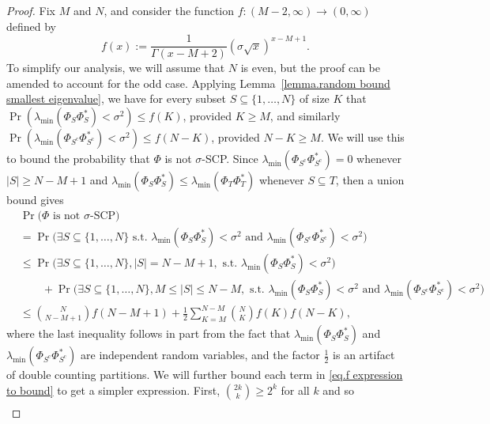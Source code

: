 \documentclass[times,10pt]{elsarticle}
\theoremstyle{plain}
\begin{document}
\begin{proof}
Fix $M$ and $N$, and consider the function $f\colon(M-2,\infty)\rightarrow(0,\infty)$ defined by
\begin{equation*}
f(x):=\frac{1}{\Gamma(x-M+2)}(\sigma\sqrt{x})^{x-M+1}.
\end{equation*}
To simplify our analysis, we will assume that $N$ is even, but the proof can be amended to account for the odd case.
Applying Lemma~\ref{lemma.random bound smallest eigenvalue}, we have for every subset $S\subseteq\{1,\ldots,N\}$ of size $K$ that $\operatorname{Pr}(\lambda_\mathrm{min}(\Phi_S\Phi_S^*)<\sigma^2)\leq f(K)$, provided $K\geq M$, and similarly $\operatorname{Pr}(\lambda_\mathrm{min}(\Phi_{S^\mathrm{c}}\Phi_{S^\mathrm{c}}^*)<\sigma^2)\leq f(N-K)$, provided $N-K\geq M$.
We will use this to bound the probability that $\Phi$ is not $\sigma$-SCP.
Since $\lambda_\mathrm{min}(\Phi_{S^\mathrm{c}}\Phi_{S^\mathrm{c}}^*)=0$ whenever $|S|\geq N-M+1$ and $\lambda_\mathrm{min}(\Phi_S\Phi_S^*)\leq\lambda_\mathrm{min}(\Phi_T\Phi_T^*)$ whenever $S\subseteq T$, then a union bound gives
\begin{align}
\nonumber
&\operatorname{Pr}\Big(\Phi\mbox{ is not $\sigma$-SCP}\Big)\\
\nonumber
&=\operatorname{Pr}\Big(\exists S\subseteq\{1,\ldots,N\}\mbox{ s.t. }\lambda_\mathrm{min}(\Phi_S\Phi_S^*)<\sigma^2\mbox{ and }\lambda_\mathrm{min}(\Phi_{S^\mathrm{c}}\Phi_{S^\mathrm{c}}^*)<\sigma^2\Big)\\
\nonumber
&\leq\operatorname{Pr}\Big(\exists S\subseteq\{1,\ldots,N\},|S|=N-M+1,\mbox{ s.t. }\lambda_\mathrm{min}(\Phi_S\Phi_S^*)<\sigma^2\Big)\\
\nonumber
&\qquad+\operatorname{Pr}\Big(\exists S\subseteq\{1,\ldots,N\},M\leq|S|\leq N-M,\mbox{ s.t. }\lambda_\mathrm{min}(\Phi_S\Phi_S^*)<\sigma^2\mbox{ and }\lambda_\mathrm{min}(\Phi_{S^\mathrm{c}}\Phi_{S^\mathrm{c}}^*)<\sigma^2\Big)\\
\label{eq.f expression to bound}
&\leq\binom{N}{N-M+1}f(N-M+1)+\frac{1}{2}\sum_{K=M}^{N-M}\binom{N}{K}f(K)f(N-K),
\end{align}
where the last inequality follows in part from the fact that $\lambda_\mathrm{min}(\Phi_S\Phi_S^*)$ and $\lambda_\mathrm{min}(\Phi_{S^\mathrm{c}}\Phi_{S^\mathrm{c}}^*)$ are independent random variables, and the factor $\frac{1}{2}$ is an artifact of double counting partitions.
We will further bound each term in \eqref{eq.f expression to bound} to get a simpler expression.
First, $\binom{2k}{k}\geq 2^k$ for all $k$ and so 
\begin{align*}

\end{align*}
\end{proof}
\end{document}
